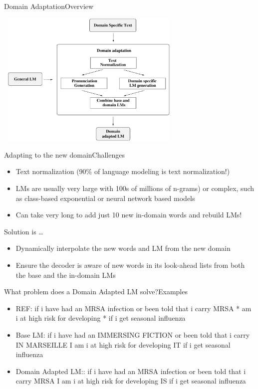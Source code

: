 \begin{frame} {Domain Adaptation}{Overview}
  \begin{center}
    \includegraphics[height=65mm,width=90mm]{figures/DomainAdaptation.pdf}
  \end{center}
\end{frame}


\begin{frame}{Adapting to the new domain}{Challenges}

\begin{itemize}
\item Text normalization (90\% of language modeling is text normalization!)
\item LMs are usually very large with 100s of millions of n-grams) or complex, such as class-based exponential or neural network based models 
\item Can take very long to add just 10 new in-domain words and rebuild LMs! \pause
\end{itemize}
Solution is \ldots
\begin{itemize}
\item  Dynamically interpolate the new words and LM from the new domain
\item  Ensure the decoder is aware of new words in its look-ahead lists from both the base and the in-domain LMs
\end{itemize}

\end{frame}


\begin{frame}{What problem does a Domain Adapted LM solve?}{Examples}

\begin{itemize}
\item {\color{green} REF:  if i have had an {\color{purple} MRSA infection} or been told that i carry {\color{purple} MRSA} *  am i at high risk for developing  *  if i get seasonal influenza}
\item {\color{red} Base LM: if i have had an {\color{purple} IMMERSING FICTION }  or been told that i carry {\color{purple} IN MARSEILLE} I  am i at high risk for developing IT  if i get seasonal influenza}
\item {\color{blue} Domain Adapted LM::  if i have had an {\color{purple} MRSA infection} or been told that i carry {\color{purple} MRSA} I am i at high risk for developing IS  if i get seasonal influenza }
\end{itemize}
\end{frame}

